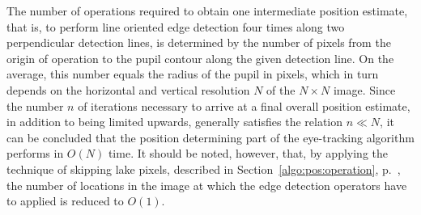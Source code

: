 The number of operations required to obtain one intermediate position
estimate, that is, to perform line oriented edge detection four times
along two perpendicular detection lines, is determined by the number
of pixels from the origin of operation to the pupil contour along the
given detection line.  On the average, this number equals the radius
of the pupil in pixels, which in turn depends on the horizontal and
vertical resolution $N$ of the $N\times N$ image.  Since the number
$n$ of iterations necessary to arrive at a final overall position
estimate, in addition to being limited upwards, generally satisfies
the relation $n\ll N$, it can be concluded that the position
determining part of the {\octopus} eye-tracking algorithm performs in
$O(N)$ time.  It should be noted, however, that, by applying the
technique of skipping lake pixels, described in
Section~\ref{algo:pos:operation}, p.~\pageref{pg:skiplakepixels}, the
number of locations in the image at which the edge detection operators
have to applied is reduced to $O(1)$.
